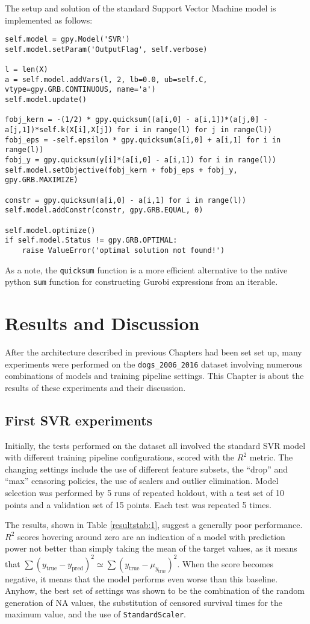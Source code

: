 \documentclass[12pt]{report}
\begin{document}
The setup and solution of the standard Support Vector Machine model is implemented as follows:
\begin{lstlisting}
self.model = gpy.Model('SVR')
self.model.setParam('OutputFlag', self.verbose)

l = len(X)
a = self.model.addVars(l, 2, lb=0.0, ub=self.C, vtype=gpy.GRB.CONTINUOUS, name='a')
self.model.update()

fobj_kern = -(1/2) * gpy.quicksum((a[i,0] - a[i,1])*(a[j,0] - a[j,1])*self.k(X[i],X[j]) for i in range(l) for j in range(l))
fobj_eps = -self.epsilon * gpy.quicksum(a[i,0] + a[i,1] for i in range(l))
fobj_y = gpy.quicksum(y[i]*(a[i,0] - a[i,1]) for i in range(l))
self.model.setObjective(fobj_kern + fobj_eps + fobj_y, gpy.GRB.MAXIMIZE)

constr = gpy.quicksum(a[i,0] - a[i,1] for i in range(l))
self.model.addConstr(constr, gpy.GRB.EQUAL, 0)

self.model.optimize()
if self.model.Status != gpy.GRB.OPTIMAL:
	raise ValueError('optimal solution not found!')
\end{lstlisting}
As a note, the \texttt{quicksum} function is a more efficient alternative to the native python \texttt{sum} function for constructing Gurobi expressions from an iterable.

\chapter{Results and Discussion}
\label{chres}
After the architecture described in previous Chapters had been set set up, many experiments were performed on the \texttt{dogs\_2006\_2016} dataset involving numerous combinations of models and training pipeline settings. This Chapter is about the results of these experiments and their discussion.

\section{First SVR experiments}
Initially, the tests performed on the dataset all involved the standard SVR model with different training pipeline configurations, scored with the $R^2$ metric. The changing settings include the use of different feature subsets, the ``drop'' and ``max'' censoring policies, the use of scalers and outlier elimination. Model selection was performed by 5 runs of repeated holdout, with a test set of 10 points and a validation set of 15 points. Each test was repeated 5 times.

The results, shown in Table \ref{resultstab:1}, suggest a generally poor performance. $R^2$ scores hovering around zero are an indication of a model with prediction power not better than simply taking the mean of the target values, as it means that $\sum(y_{\text{true}} - y_{\text{pred}})^2 \simeq \sum(y_{\text{true}} - \mu_{y_{\text{true}}})^2$. When the score becomes negative, it means that the model performs even worse than this baseline. Anyhow, the best set of settings was shown to be the combination of the random generation of NA values, the substitution of censored survival times for the maximum value, and the use of \texttt{StandardScaler}.
\end{document}

